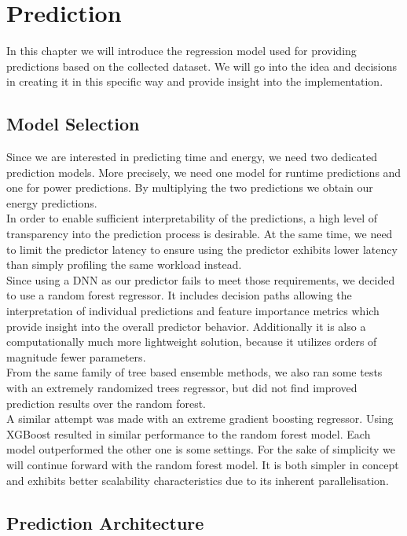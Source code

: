 \chapter{Prediction}\label{chap:contrib2}

In this chapter we will introduce the regression model used for providing predictions based on the collected dataset. We will go into the idea and decisions in creating it in this specific way and provide insight into the implementation.


\section{Model Selection}
Since we are interested in predicting time and energy, we need two dedicated prediction models. More precisely, we need one model for runtime predictions and one for power predictions. By multiplying the two predictions we obtain our energy predictions. \\
In order to enable sufficient interpretability of the predictions, a high level of transparency into the prediction process is desirable. At the same time, we need to limit the predictor latency to ensure using the predictor exhibits lower latency than simply profiling the same workload instead. \\
Since using a DNN as our predictor fails to meet those requirements, we decided to use a random forest regressor. It includes decision paths allowing the interpretation of individual predictions and feature importance metrics which provide insight into the overall predictor behavior. Additionally it is also a computationally much more lightweight solution, because it utilizes orders of magnitude fewer parameters. \\
From the same family of tree based ensemble methods, we also ran some tests with an extremely randomized trees regressor, but did not find improved prediction results over the random forest. \\
A similar attempt was made with an extreme gradient boosting regressor. Using XGBoost resulted in similar performance to the random forest model. Each model outperformed the other one is some settings. For the sake of simplicity we will continue forward with the random forest model. It is both simpler in concept and exhibits better scalability characteristics due to its inherent parallelisation.



\section{Prediction Architecture}

